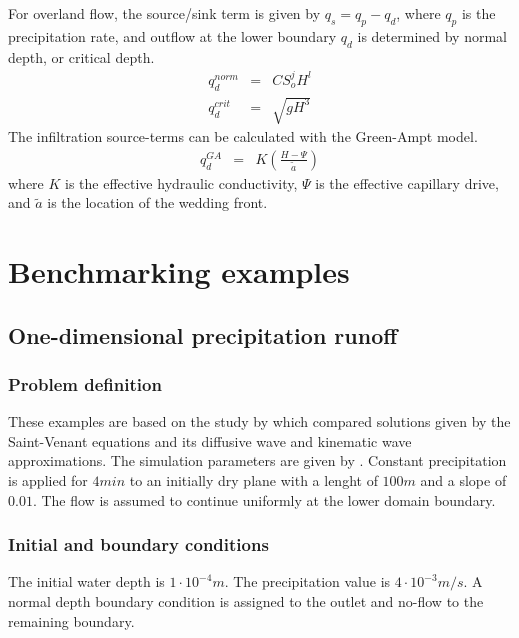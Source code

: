 For overland flow, the source/sink term is given by $q_s = q_p - q_d$, where $q_p$ is the precipitation rate, and outflow at the lower boundary $q_d$ is determined by normal depth, or critical depth.
%
\begin{eqnarray}
q_d^{norm}&=& CS_o^j H^l \\
q_d^{crit} &=& \sqrt{ gH^3}
\end{eqnarray}
%
The infiltration source-terms can be calculated with the Green-Ampt model.
%
\begin{eqnarray}
q_d^{GA} &=& K \left( \frac{H - \Psi}{\tilde{a}} \right) 
\label{eqn:OLF_Green_Ampt}
\end{eqnarray}
%
where $K$ is the effective hydraulic conductivity, $\Psi$ is the effective capillary drive, and $\tilde{a}$ is the location of the wedding front.
%
%
%
%
\section{Benchmarking examples}
\label{sec:SurfaceBechmarks}
%
\subsection{One-dimensional precipitation runoff}
\label{sec:Govindaraju}
%
\subsubsection*{Problem definition}
%
These examples are based on the study by \cite{Gov:88} which compared solutions given by the Saint-Venant equations and its diffusive wave and kinematic wave approximations. The simulation parameters are given by \cite{Therrien:04}.
Constant precipitation is applied for $4 min$ to an initially dry plane with a lenght of $100m$ and a slope of $0.01$. The flow is assumed to continue uniformly at the lower domain boundary.
%
\subsubsection*{Initial and boundary conditions}
%
The initial water depth is $1\cdot 10^{-4}m$. The precipitation value is $4 \cdot 10^{-3} m/s$.
A normal depth boundary condition is assigned to the outlet and no-flow to the remaining boundary.
%
